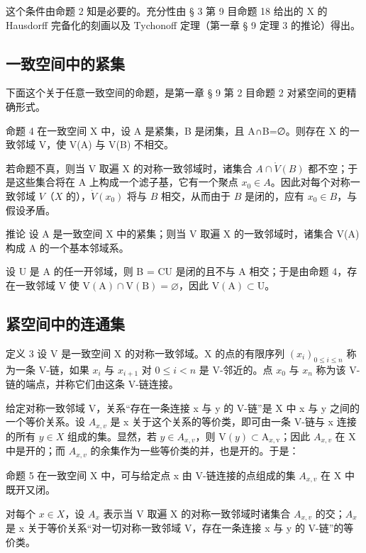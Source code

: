 这个条件由命题 2 知是必要的。充分性由 § 3 第 9 目命题 18 给出的 X 的 Hausdorff 完备化的刻画以及 Tychonoff 定理（第一章 § 9 定理 3 的推论）得出。

\subsection{一致空间中的紧集}

下面这个关于任意一致空间的命题，是第一章 § 9 第 2 目命题 2 对紧空间的更精确形式。

命题 4 在一致空间 X 中，设 A 是紧集，B 是闭集，且 A∩B=∅。则存在 X 的一致邻域 V，使 V(A) 与 V(B) 不相交。

若命题不真，则当 V 取遍 X 的对称一致邻域时，诸集合 \(A \cap \mathring{V}(B)\) 都不空；于是这些集合将在 A 上构成一个滤子基，它有一个聚点 \(x_0 \in A\)。因此对每个对称一致邻域 \(V\)（\(X\) 的），\(\dot{V}(x_0)\) 将与 \(B\) 相交，从而由于 \(B\) 是闭的，应有 \(x_0 \in B\)，与假设矛盾。

推论 设 A 是一致空间 X 中的紧集；则当 V 取遍 X 的一致邻域时，诸集合 V(A) 构成 A 的一个基本邻域系。

设 U 是 A 的任一开邻域，则 B = CU 是闭的且不与 A 相交；于是由命题 4，存在一致邻域 V 使 \(\mathrm{V}(\mathrm{A}) \cap \mathrm{V}(\mathrm{B}) = \varnothing\)，因此 \(\mathrm{V}(\mathrm{A}) \subset \mathrm{U}\)。

\subsection{紧空间中的连通集}

定义 3 设 V 是一致空间 X 的对称一致邻域。X 的点的有限序列 \((x_{i})_{0\leqslant i\leqslant n}\) 称为一条 V-链，如果 \(x_{i}\) 与 \(x_{i+1}\) 对 \(0\leqslant i<n\) 是 V-邻近的。点 \(x_{0}\) 与 \(x_{n}\) 称为该 V-链的端点，并称它们由这条 V-链连接。

给定对称一致邻域 V，关系“存在一条连接 x 与 y 的 V-链”是 X 中 x 与 y 之间的一个等价关系。设 \(A_{x,v}\) 是 x 关于这个关系的等价类，即可由一条 V-链与 x 连接的所有 \(y \in X\) 组成的集。显然，若 \(y \in A_{x,v}\)，则 \(\mathrm{V}(y) \subset \mathrm{A}_{x,\mathrm{v}}\)；因此 \(A_{x,v}\) 在 X 中是开的；而 \(A_{x,v}\) 的余集作为一些等价类的并，也是开的。于是：

命题 5 在一致空间 X 中，可与给定点 x 由 V-链连接的点组成的集 \(A_{x,v}\) 在 X 中既开又闭。

对每个 \(x \in X\)，设 \(A_{x}\) 表示当 V 取遍 X 的对称一致邻域时诸集合 \(A_{x,v}\) 的交；\(A_{x}\) 是 x 关于等价关系“对一切对称一致邻域 V，存在一条连接 x 与 y 的 V-链”的等价类。

